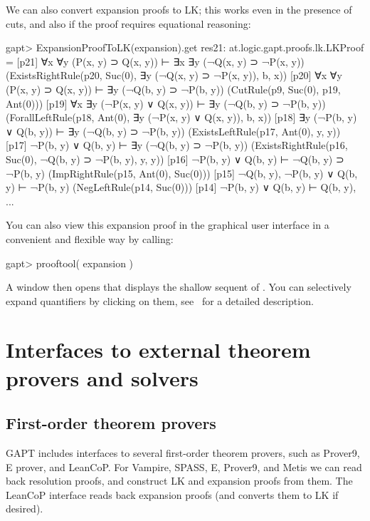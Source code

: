 \documentclass[a4paper,11pt]{book}
\newcommand{\cli}[1]{{\ttfamily {#1}}}
\begin{document}
We can also convert expansion proofs to LK; this works even in the presence of
cuts, and also if the proof requires equational reasoning:
\begin{clilisting}
gapt> ExpansionProofToLK(expansion).get
res21: at.logic.gapt.proofs.lk.LKProof =
[p21] ∀x ∀y (P(x, y) ⊃ Q(x, y)) ⊢ ∃x ∃y (¬Q(x, y) ⊃ ¬P(x, y))    (ExistsRightRule(p20, Suc(0), ∃y (¬Q(x, y) ⊃ ¬P(x, y)), b, x))
[p20] ∀x ∀y (P(x, y) ⊃ Q(x, y)) ⊢ ∃y (¬Q(b, y) ⊃ ¬P(b, y))    (CutRule(p9, Suc(0), p19, Ant(0)))
[p19] ∀x ∃y (¬P(x, y) ∨ Q(x, y)) ⊢ ∃y (¬Q(b, y) ⊃ ¬P(b, y))    (ForallLeftRule(p18, Ant(0), ∃y (¬P(x, y) ∨ Q(x, y)), b, x))
[p18] ∃y (¬P(b, y) ∨ Q(b, y)) ⊢ ∃y (¬Q(b, y) ⊃ ¬P(b, y))    (ExistsLeftRule(p17, Ant(0), y, y))
[p17] ¬P(b, y) ∨ Q(b, y) ⊢ ∃y (¬Q(b, y) ⊃ ¬P(b, y))    (ExistsRightRule(p16, Suc(0), ¬Q(b, y) ⊃ ¬P(b, y), y, y))
[p16] ¬P(b, y) ∨ Q(b, y) ⊢ ¬Q(b, y) ⊃ ¬P(b, y)    (ImpRightRule(p15, Ant(0), Suc(0)))
[p15] ¬Q(b, y), ¬P(b, y) ∨ Q(b, y) ⊢ ¬P(b, y)    (NegLeftRule(p14, Suc(0)))
[p14] ¬P(b, y) ∨ Q(b, y) ⊢ Q(b, y), ...

\end{clilisting}

You can also view this expansion proof in the graphical user interface in
a convenient and flexible way by calling:
\begin{clilisting}
gapt> prooftool( expansion )

\end{clilisting}

A window then opens that displays the shallow sequent of \cli{expansion}.  You
can selectively expand quantifiers by clicking on them,
see~\cite{Hetzl13Understanding} for a detailed description.



\chapter{Interfaces to external theorem provers and solvers}


\section{First-order theorem provers}\label{sec:fol_provers}

GAPT includes interfaces to several first-order theorem provers, such as
Prover9, E prover, and LeanCoP.  For Vampire, SPASS, E, Prover9, and Metis we can read back
resolution proofs, and construct LK and expansion proofs from them.  The
LeanCoP interface reads back expansion proofs (and converts them to LK if desired).
\end{document}
